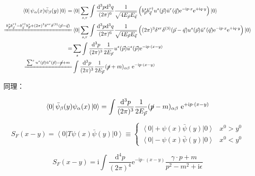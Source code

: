 \documentclass{article}
\begin{document}
$$
  \begin{aligned}
    \left\langle0\right|\psi_{\alpha}(x)\bar{\psi}_{\beta}(y)\left|0\right\rangle=                                                        & \left\langle0\right|\sum_{s,r}\int\frac{\mathrm{d}^3p\mathrm{d}^3q}{(2\pi)^6}\frac{1}{\sqrt{4E_{\vec{p}}E_{\vec{q}}}}\left(b_{\vec{p}}^sb_{\vec{q}}^{r\dagger}u^s(\vec{p})\bar{u}^r(\vec{q})\mathrm{e}^{-\mathrm{i}p\cdot x}\mathrm{e}^{+\mathrm{i}q\cdot y}\right)\left|0\right\rangle              \\
    \xlongequal{b_{\vec{p}}^sb_{\vec{q}}^{r\dagger}=b_{\vec{q}}^{r\dagger}b_{\vec{p}}^s+(2\pi)^3\delta^{sr}\delta^{(3)}(\vec{p}-\vec{q})} & \left\langle0\right|\sum_{s,r}\int\frac{\mathrm{d}^3p\mathrm{d}^3q}{(2\pi)^6}\frac{1}{\sqrt{4E_{\vec{p}}E_{\vec{q}}}}\left((2\pi)^3\delta^{sr}\delta^{(3)}(\vec{p}-\vec{q})u^s(\vec{p})\bar{u}^r(\vec{q})\mathrm{e}^{-\mathrm{i}p\cdot x}\mathrm{e}^{+\mathrm{i}q\cdot y}\right)\left|0\right\rangle \\
    =                                                                                                                                     & \sum_s\int\frac{\mathrm{d}^3p}{(2\pi)^3}\frac{1}{2E_{\vec{p}}}u^s(\vec{p})\bar{u}^s(\vec{p})\mathrm{e}^{-\mathrm{i}p\cdot(x-y)}                                                                                                                                                                      \\
    \xlongequal{\sum^su^s(\vec{p})\bar{u}^s(\vec{p})=\cancel{p}+m}                                                                        & \int\frac{\mathrm{d}^3p}{(2\pi)^3}\frac{1}{2E_{\vec{p}}}(\cancel{p}+m)_{\alpha\beta}\ \mathrm{e}^{-\mathrm{i}p\cdot(x-y)}
  \end{aligned}
$$

同理：

$$\left\langle0\right|\bar{\psi}_{\beta}(y)\psi_{\alpha}(x)\left|0\right\rangle=\int\frac{\mathrm{d}^3p}{(2\pi)^3}\frac{1}{2E_{\vec{p}}}(\cancel{p}-m)_{\alpha\beta}\ \mathrm{e}^{+\mathrm{i}p\cdot(x-y)}$$

$$
  S_F(x-y)=\left\langle0\right|T\psi(x)\bar{\psi}(y)\left|0\right\rangle\equiv\begin{cases}
    \left\langle0\right|+\psi(x)\bar{\psi}(y)\left|0\right\rangle & x^0>y^0 \\ \left\langle0\right|-\psi(x)\bar{\psi}(y)\left|0\right\rangle & x^0<y^0
  \end{cases}
$$

$$
  S_F(x-y)=\mathrm{i}\int\frac{\mathrm{d}^4p}{(2\pi)^4}\mathrm{e}^{-\mathrm{i}p\cdot(x-y)}\frac{\gamma\cdot p+m}{p^2-m^2+\mathrm{i}\epsilon}
$$
\end{document}
